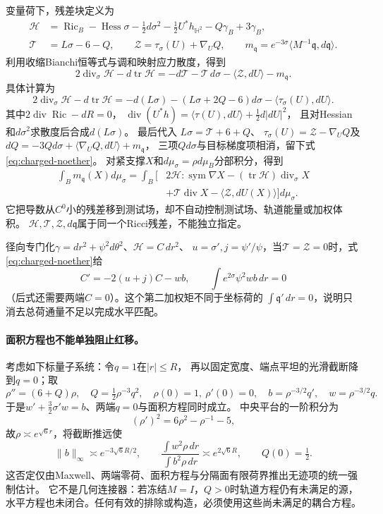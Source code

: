 \documentclass[UTF8,a4paper,11pt,fontset=fandol]{ctexart}
\numberwithin{equation}{section}
\theoremstyle{definition}
\newcommand{\Ric}{\operatorname{Ric}}
\newcommand{\tr}{\operatorname{tr}}
\begin{document}
变量荷下，残差块定义为
\begin{align}
 \mathscr H&=\Ric_B-\operatorname{Hess}\sigma
       -\tfrac12d\sigma^2-\tfrac12U^*h_{\mathbb H^2}-Q\gamma_B+3\gamma_B,\nonumber\\
 \mathscr T&=L\sigma-6-Q,\qquad
 \mathscr Z=\tau_\sigma(U)+\nabla_UQ,
 \qquad m_{\mathfrak q}=e^{-3\sigma}
          \langle M^{-1}\mathfrak q,d\mathfrak q\rangle.\label{eq:charged-blocks}
\end{align}
利用收缩Bianchi恒等式与调和映射应力散度，得到
\begin{equation}\label{eq:charged-noether}
 2\operatorname{div}_\sigma\mathscr H-d\tr\mathscr H
 =-d\mathscr T-\mathscr T\,d\sigma
 -\langle\mathscr Z,dU\rangle-m_{\mathfrak q}.
\end{equation}
具体计算为
\[
 2\operatorname{div}_\sigma\mathscr H-d\tr\mathscr H
 =-d(L\sigma)-(L\sigma+2Q-6)d\sigma
                  -\langle\tau_\sigma(U),dU\rangle.
\]
其中$2\operatorname{div}\Ric-dR=0$，
$\operatorname{div}(U^*h)=\langle\tau(U),dU\rangle+\tfrac12d|dU|^2$，
且对Hessian和$d\sigma^2$求散度后合成$d(L\sigma)$。
最后代入
$L\sigma=\mathscr T+6+Q$、
$\tau_\sigma(U)=\mathscr Z-\nabla_UQ$及
$dQ=-3Qd\sigma+\langle\nabla_UQ,dU\rangle+m_{\mathfrak q}$，
三项$Qd\sigma$与目标梯度项相消，留下式\eqref{eq:charged-noether}。
对紧支撑$X$和$d\mu_\sigma=\rho d\mu_B$分部积分，得到
\begin{align}
 \int_Bm_{\mathfrak q}(X)d\mu_\sigma
 =\int_B\bigl[&2\mathscr H:\operatorname{sym}\nabla X
  -(\tr\mathscr H)\operatorname{div}_\sigma X\nonumber\\
 &+\mathscr T\operatorname{div}X
  -\langle\mathscr Z,dU(X)\rangle\bigr]d\mu_\sigma.\label{eq:charged-pairing}
\end{align}
它把导数从$C^0$小的残差移到测试场，却不自动控制测试场、轨道能量或加权体积。
$\mathscr H,\mathscr T,\mathscr Z,d\mathfrak q$属于同一个Ricci残差，不能独立指定。

径向专门化$\gamma=dr^2+\psi^2d\theta^2$、$\mathscr H=C\,dr^2$、
$u=\sigma',j=\psi'/\psi$，当$\mathscr T=\mathscr Z=0$时，式\eqref{eq:charged-noether}给
\[
 C'=-2(u+j)C-wb,
 \qquad\int e^{2\sigma}\psi^2wb\,dr=0
\]
（后式还需要两端$C=0$）。这个第二加权矩不同于坐标荷的
$\int\mathfrak q'\,dr=0$，说明只消去总荷通量不足以完成水平匹配。

\paragraph{面积方程也不能单独阻止红移。}
考虑如下标量子系统：令$q=1$在$|r|\le R$，
再以固定宽度、端点平坦的光滑截断降到$q=0$；取
\[
 \rho''=(6+Q)\rho,\quad Q=\tfrac12\rho^{-3}q^2,
 \quad\rho(0)=1,\ \rho'(0)=0,
 \quad b=\rho^{-3/2}q',\quad w=\rho^{-3/2}q.
\]
于是$w'+\frac32\sigma'w=b$、两端$q=0$与面积方程同时成立。
中央平台的一阶积分为
\[
 (\rho')^2=6\rho^2-\rho^{-1}-5,
\]
故$\rho\asymp e^{\sqrt6r}$，将截断推远使
\[
 \|b\|_\infty\asymp e^{-3\sqrt6R/2},
 \qquad
 \frac{\int w^2\rho\,dr}{\int b^2\rho\,dr}\asymp e^{2\sqrt6R},
 \qquad Q(0)=\tfrac12.
\]
这否定仅由Maxwell、两端零荷、面积方程与分隔面有限荷界推出无迹项的统一强制估计。
它不是几何连接器：若冻结$M=I$，$Q>0$时轨道方程仍有未满足的源，
水平方程也未闭合。任何有效的排除或构造，必须使用这些尚未满足的耦合方程。
\end{document}
